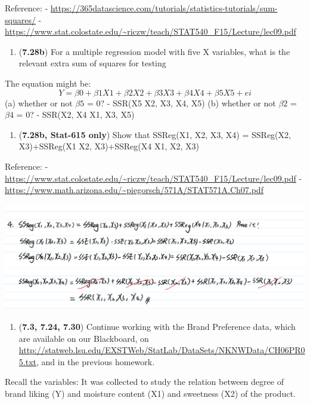 \documentclass[
]{article}
\providecommand{\tightlist}{%
  \setlength{\itemsep}{0pt}\setlength{\parskip}{0pt}}
\begin{document}
Reference: -
\url{https://365datascience.com/tutorials/statistics-tutorials/sum-squares/}
-
\url{https://www.stat.colostate.edu/~riczw/teach/STAT540_F15/Lecture/lec09.pdf}

\begin{enumerate}
\def\labelenumi{\arabic{enumi}.}
\setcounter{enumi}{2}
\tightlist
\item
  (\textbf{7.28b}) For a multiple regression model with five X
  variables, what is the relevant extra sum of squares for testing
\end{enumerate}

The equation might be: \[
Y = \beta0 + \beta1X1 + \beta2X2 + \beta3X3 + \beta4X4 + \beta5X5 + ei
\] (a) whether or not \(\beta5\) = 0? - SSR(X5 \textbar{} X2, X3, X4,
X5) (b) whether or not \(\beta2\) = \(\beta4\) = 0? - SSR(X2, X4
\textbar{} X1, X3, X5)

\begin{enumerate}
\def\labelenumi{\arabic{enumi}.}
\setcounter{enumi}{3}
\tightlist
\item
  (\textbf{7.28b, Stat-615 only}) Show that SSReg(X1, X2, X3, X4) =
  SSReg(X2, X3)+SSReg(X1 \textbar{} X2, X3)+SSReg(X4 \textbar{} X1, X2,
  X3)
\end{enumerate}

Reference: -
\url{https://www.stat.colostate.edu/~riczw/teach/STAT540_F15/Lecture/lec09.pdf}
- \url{https://www.math.arizona.edu/~piegorsch/571A/STAT571A.Ch07.pdf}

\includegraphics{pics/4.jpeg}

\begin{enumerate}
\def\labelenumi{\arabic{enumi}.}
\setcounter{enumi}{4}
\tightlist
\item
  (\textbf{7.3, 7.24, 7.30}) Continue working with the Brand Preference
  data, which are available on our Blackboard, on
  \url{http://statweb.lsu.edu/EXSTWeb/StatLab/DataSets/NKNWData/CH06PR05.txt},
  and in the previous homework.
\end{enumerate}

Recall the variables: It was collected to study the relation between
degree of brand liking (Y) and moisture content (X1) and sweetness (X2)
of the product.
\end{document}
